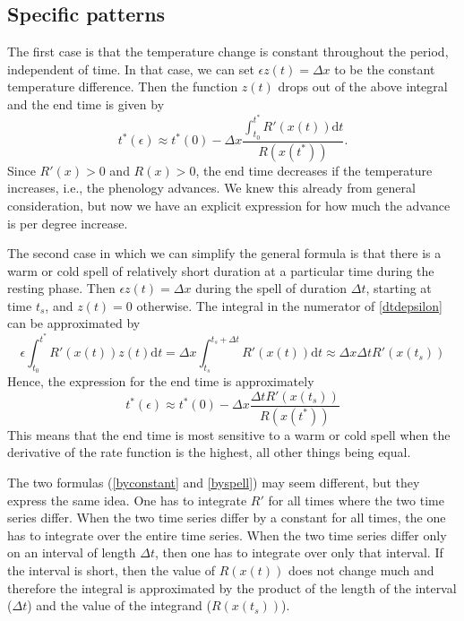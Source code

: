 \documentclass[12 pt]{article}
\begin{document}
\subsection*{Specific patterns}
The first case is that the temperature change is constant throughout the period, independent of time. In that case, we can set $\epsilon z(t)=\Delta x$ to be the constant temperature difference. Then the function $z(t)$ drops out of the above integral and the end time is given by
\begin{equation}\label{byconstant}
    t^*(\epsilon) \approx t^*(0) - \Delta x \frac{\int _{t_0} ^{t^*} R'(x(t)) \mathrm{d}t}{R(x(t^*))}. \tag*{Eq. S\theequation}
\end{equation}
Since $R'(x)>0$ and $R(x)>0$, the end time decreases if the temperature increases, i.e., the phenology advances. We knew this already from general consideration, but now we have an explicit expression for how much the advance is per degree increase. \par

The second case in which we can simplify the general formula is that there is a warm or cold spell of relatively short duration at a particular time during the resting phase. Then $\epsilon z(t)=\Delta x$ during the spell of duration $\Delta t$, starting at time $t_s$, and $z(t)=0$ otherwise. The integral in the numerator of \ref{dtdepsilon} can be approximated by
\begin{equation}
    \epsilon \int _{t_0} ^{t^*} R'(x(t)) z(t) \mathrm{d}t = \Delta x \int _{t_s} ^{t_s + \Delta t}R'(x(t)) \mathrm{d}t \approx \Delta x \Delta t R'(x(t_s)) \tag*{Eq. S\theequation}
\end{equation}
Hence, the expression for the end time is approximately
\begin{equation}\label{byspell}
    t^*(\epsilon) \approx t^*(0)-\Delta x \frac{\Delta t R'(x(t_s))}{R(x(t^*))} \tag*{Eq. S\theequation}
\end{equation}
This means that the end time is most sensitive to a warm or cold spell when the derivative of the rate function is the highest, all other things being equal. \par
The two formulas (\ref{byconstant} and \ref{byspell}) may seem different, but they express the same idea. One has to integrate $R'$ for all times where the two time series differ. When the two time series differ by a constant for all times, the one has to integrate over the entire time series. When the two time series differ only on an interval of length $\Delta t$, then one has to integrate over only that interval. If the interval is short, then the value of $R(x(t))$ does not change much and therefore the integral is approximated by the product of the length of the interval ($\Delta t$) and the value of the integrand ($R(x(t_s))$). 
\end{document}
